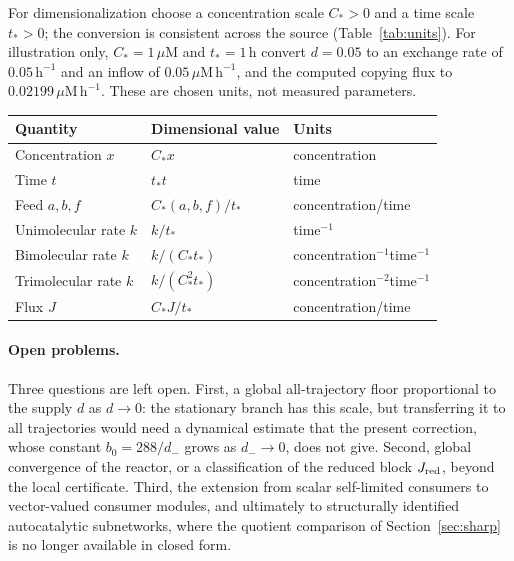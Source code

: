 \documentclass[11pt,a4paper]{article}
\theoremstyle{plain}
\theoremstyle{definition}
\theoremstyle{remark}
\begin{document}
For dimensionalization choose a concentration scale $C_*>0$ and a time scale $t_*>0$; the conversion is consistent across the source (Table~\ref{tab:units}). For illustration only, $C_*=1\,\mu$M and $t_*=1\,$h convert $d=0.05$ to an exchange rate of $0.05\,\mathrm h^{-1}$ and an inflow of $0.05\,\mu\mathrm M\,\mathrm h^{-1}$, and the computed copying flux to $0.02199\,\mu\mathrm M\,\mathrm h^{-1}$. These are chosen units, not measured parameters.

\begin{center}
\label{tab:units}
\begin{tabular}{lll}\toprule
Quantity&Dimensional value&Units\\\midrule
Concentration $x$&$C_*x$&concentration\\
Time $t$&$t_*t$&time\\
Feed $a,b,f$&$C_*(a,b,f)/t_*$&concentration/time\\
Unimolecular rate $k$&$k/t_*$&time$^{-1}$\\
Bimolecular rate $k$&$k/(C_*t_*)$&concentration$^{-1}$time$^{-1}$\\
Trimolecular rate $k$&$k/(C_*^2t_*)$&concentration$^{-2}$time$^{-1}$\\
Flux $J$&$C_*J/t_*$&concentration/time\\\bottomrule
\end{tabular}
\end{center}

\paragraph{Open problems.}
Three questions are left open. First, a global all-trajectory floor proportional to the supply $d$ as $d\to0$: the stationary branch has this scale, but transferring it to all trajectories would need a dynamical estimate that the present correction, whose constant $b_0=288/d_-$ grows as $d_-\to0$, does not give. Second, global convergence of the reactor, or a classification of the reduced block $J_{\rm red}$, beyond the local certificate. Third, the extension from scalar self-limited consumers to vector-valued consumer modules, and ultimately to structurally identified autocatalytic subnetworks, where the quotient comparison of Section~\ref{sec:sharp} is no longer available in closed form.
\end{document}
